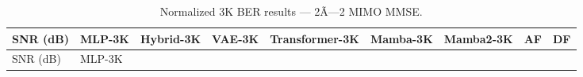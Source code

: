 \begin{longtable}[]{@{}
  >{\raggedright\arraybackslash}p{}
  >{\raggedright\arraybackslash}p{}
  >{\raggedright\arraybackslash}p{}
  >{\raggedright\arraybackslash}p{}
  >{\raggedright\arraybackslash}p{}
  >{\raggedright\arraybackslash}p{}
  >{\raggedright\arraybackslash}p{}
  >{\raggedright\arraybackslash}p{}
  >{\raggedright\arraybackslash}p{}@{}}
\caption{Normalized 3K BER results --- 2Ã—2 MIMO MMSE.}\label{tbl:table11}\tabularnewline
\toprule\noalign{}
\begin{minipage}[b]{\linewidth}\raggedright
SNR (dB)
\end{minipage} & \begin{minipage}[b]{\linewidth}\raggedright
MLP-3K
\end{minipage} & \begin{minipage}[b]{\linewidth}\raggedright
Hybrid-3K
\end{minipage} & \begin{minipage}[b]{\linewidth}\raggedright
VAE-3K
\end{minipage} & \begin{minipage}[b]{\linewidth}\raggedright
Transformer-3K
\end{minipage} & \begin{minipage}[b]{\linewidth}\raggedright
Mamba-3K
\end{minipage} & \begin{minipage}[b]{\linewidth}\raggedright
Mamba2-3K
\end{minipage} & \begin{minipage}[b]{\linewidth}\raggedright
AF
\end{minipage} & \begin{minipage}[b]{\linewidth}\raggedright
DF
\end{minipage} \\
\midrule\noalign{}
\endfirsthead
\toprule\noalign{}
\begin{minipage}[b]{\linewidth}\raggedright
SNR (dB)
\end{minipage} & \begin{minipage}[b]{\linewidth}\raggedright
MLP-3K
\end{minipage} & \begin{minipage}[b]{\linewidth}\raggedright

\end{minipage}
\end{longtable}
